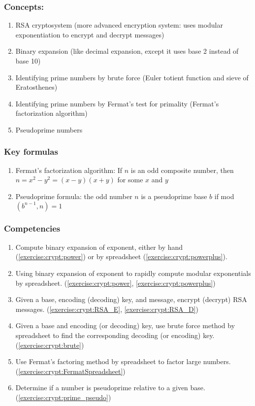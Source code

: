 \subsubsection*{Concepts:}
\begin{enumerate}
\item 
RSA cryptosystem (more advanced encryption system: uses modular exponentiation to encrypt and decrypt messages)
\item
Binary expansion (like decimal expansion, except it uses base 2 instead of base 10)
\item
Identifying prime numbers by brute force (Euler totient function and sieve of Eratosthenes)
\item
Identifying prime numbers by Fermat's test for primality (Fermat's factorization algorithm)
\item
Pseudoprime numbers
\end{enumerate}

\subsubsection*{Key formulas}
\begin{enumerate}
\item
Fermat's factorization algorithm: If $n$ is an odd composite number, then $n = x^{2} - y^{2} = (x - y)(x + y)$ for some $x$ and $y$
\item
Pseudoprime formula: the odd number $n$ is a pseudoprime base $b$ if mod$(b^{n-1},n) = 1$
\end{enumerate}

\subsubsection*{Competencies}
\begin{enumerate}
\item
Compute binary expansion of exponent, either by hand (\ref{exercise:crypt:power}) or by spreadsheet (\ref{exercise:crypt:powerplus}).
\item
Using binary expansion of exponent to rapidly compute modular exponentials by spreadsheet. (\ref{exercise:crypt:power}, \ref{exercise:crypt:powerplus})
\item
Given a base, encoding (decoding) key, and message, encrypt (decrypt) RSA messages. (\ref{exercise:crypt:RSA_E}, \ref{exercise:crypt:RSA_D})
\item
Given a base and encoding (or decoding) key, use brute force method by spreadsheet to find the corresponding decoding (or encoding) key. (\ref{exercise:crypt:brute})
\item
Use Fermat's factoring method by spreadsheet to factor large numbers. (\ref{exercise:crypt:FermatSpreadsheet})
\item
Determine if a number is pseudoprime relative to a given base. (\ref{exercise:crypt:prime_pseudo})
\end{enumerate}
